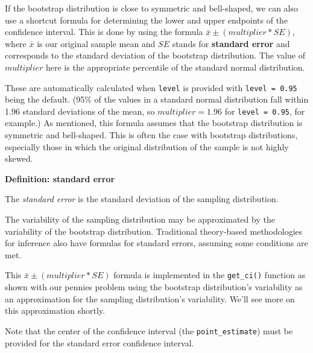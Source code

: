 \documentclass[12pt,]{krantz}
\makeatletter
\newenvironment{Shaded}{\begin{snugshade}}{\end{snugshade}}
\newcommand{\KeywordTok}[1]{\textcolor[rgb]{0.27,0.27,0.27}{\textbf{#1}}}
\newcommand{\DataTypeTok}[1]{\textcolor[rgb]{0.27,0.27,0.27}{#1}}
\newcommand{\StringTok}[1]{\textcolor[rgb]{0.5,0.5,0.5}{#1}}
\newcommand{\OperatorTok}[1]{\textcolor[rgb]{0.43,0.43,0.43}{\textbf{#1}}}
\newcommand{\NormalTok}[1]{#1}
\newenvironment{kframe}{%
\medskip{}
\setlength{\fboxsep}{.8em}
 \def\at@end@of@kframe{}%
 \ifinner\ifhmode%
  \def\at@end@of@kframe{\end{minipage}}%
  \begin{minipage}{\columnwidth}%
 \fi\fi%
 \def\FrameCommand##1{\hskip\@totalleftmargin \hskip-\fboxsep
 \colorbox{shadecolor}{##1}\hskip-\fboxsep
     \hskip-\linewidth \hskip-\@totalleftmargin \hskip\columnwidth}%
 \MakeFramed {\advance\hsize-\width
   \@totalleftmargin\z@ \linewidth\hsize
   \@setminipage}}%
 {\par\unskip\endMakeFramed%
 \at@end@of@kframe}
\renewenvironment{Shaded}{\begin{kframe}}{\end{kframe}}
\theoremstyle{definition}
\theoremstyle{definition}
\theoremstyle{definition}
\theoremstyle{remark}
\makeatother
\begin{document}
If the bootstrap distribution is close to symmetric and bell-shaped, we
can also use a shortcut formula for determining the lower and upper
endpoints of the confidence interval. This is done by using the formula
\(\bar{x} \pm (multiplier * SE),\) where \(\bar{x}\) is our original
sample mean and \(SE\) stands for \textbf{standard error} and
corresponds to the standard deviation of the bootstrap distribution. The
value of \(multiplier\) here is the appropriate percentile of the
standard normal distribution.

These are automatically calculated when \texttt{level} is provided with
\texttt{level\ =\ 0.95} being the default. (95\% of the values in a
standard normal distribution fall within 1.96 standard deviations of the
mean, so \(multiplier = 1.96\) for \texttt{level\ =\ 0.95}, for
example.) As mentioned, this formula assumes that the bootstrap
distribution is symmetric and bell-shaped. This is often the case with
bootstrap distributions, especially those in which the original
distribution of the sample is not highly skewed.

\textbf{Definition: standard error}

The \emph{standard error} is the standard deviation of the sampling
distribution.

The variability of the sampling distribution may be approximated by the
variability of the bootstrap distribution. Traditional theory-based
methodologies for inference also have formulas for standard errors,
assuming some conditions are met.

This \(\bar{x} \pm (multiplier * SE)\) formula is implemented in the
\texttt{get\_ci()} function as shown with our pennies problem using the
bootstrap distribution's variability as an approximation for the
sampling distribution's variability. We'll see more on this
approximation shortly.

Note that the center of the confidence interval (the
\texttt{point\_estimate}) must be provided for the standard error
confidence interval.

\begin{Shaded}
\end{Shaded}
\end{document}
